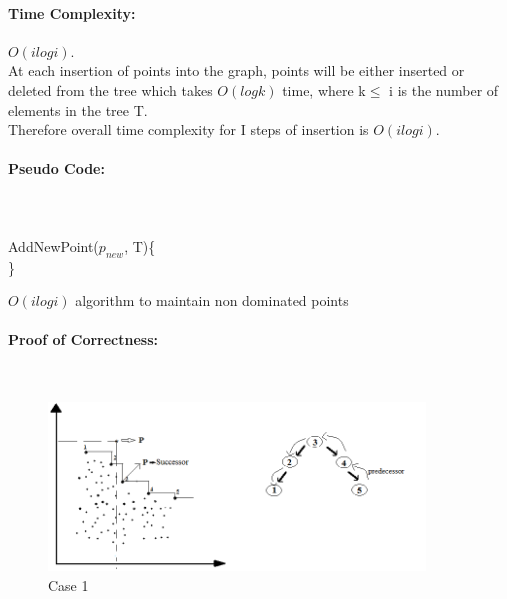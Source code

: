 \documentclass[pdftex,a4paper,12pt]{report}
\begin{document}
\paragraph{Time Complexity:} \textbf{$O(i logi)$}.\\
At each insertion of points into the graph, points will be either inserted or deleted from the tree which takes
$O(log k)$ time, where k$\leq$ i is the number of elements in the tree T.\\
Therefore overall time complexity for I steps of insertion is $O(i log i)$.

\newpage
\begin{algorithm}
\paragraph{Pseudo Code:}\makebox[2pt]{}\\
\makebox[2pt]{}\\AddNewPoint($p_{new}$, T)\{\\
\}
\caption{\textbf{$O(i logi)$} algorithm to maintain non dominated points}
\label{algo}
\end{algorithm}
\newpage
\paragraph{Proof of Correctness:} \makebox[2pt]{}\\
\begin{figure}[ht!]
\centering
\includegraphics[width=100mm]{p11.png}
\caption{Case 1}
\label{fig1}
\end{figure}
\end{document}
